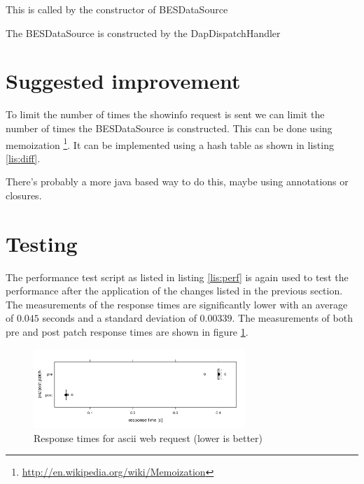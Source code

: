\documentclass{article}
\begin{document}
This is called by the constructor of BESDataSource 



The BESDataSource is constructed by the DapDispatchHandler





\section{Suggested improvement}
To limit the number of times the showinfo request is sent we can limit the number of times the BESDataSource is constructed. This can be done using memoization \footnote{\url{http://en.wikipedia.org/wiki/Memoization}}. It can be implemented using a hash table as shown in listing \ref{lis:diff}. 


There's probably a more java based way to do this, maybe using annotations or closures.  

\section{Testing}
The performance test script as listed in listing \ref{lis:perf} is again used to test the performance after the application of the changes listed in the previous section. The measurements of the response times are significantly lower with an average of $0.045$ seconds and a standard deviation of $0.00339$. The measurements of both pre and post patch response times are shown in figure \ref{fig:response}. 

\begin{figure}
\centering
\includegraphics[width=8cm,height=3cm]{prepost}
\caption{Response times for ascii web request (lower is better)}
\label{fig:response}
\end{figure}
\end{document}
